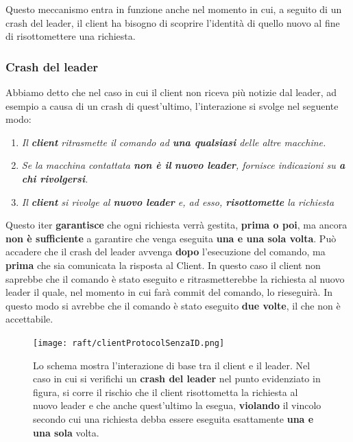	Questo meccanismo entra in funzione anche nel momento in cui, a seguito di un crash del leader, il client ha bisogno di scoprire l'identità di quello nuovo al fine di risottomettere una richiesta.  

	\subsubsection{Crash del leader}

	Abbiamo detto che nel caso in cui il client non riceva più notizie dal leader, ad esempio a causa di un crash di quest'ultimo, l'interazione si svolge nel seguente modo:

	\begin{enumerate}
		\item{\emph{Il \textbf{client} ritrasmette il comando ad \textbf{una qualsiasi} delle altre macchine. }}
		\item{\emph{Se la macchina contattata \textbf{non è il }\textbf{nuovo leader}, fornisce indicazioni su \textbf{a chi rivolgersi}.}}
		\item{\emph{Il \textbf{client} si rivolge al \textbf{nuovo leader} e, ad esso, \textbf{risottomette} la richiesta}}
	\end{enumerate}

	Questo iter \textbf{garantisce} che ogni richiesta verrà gestita, \textbf{prima o poi}, ma ancora \textbf{non è sufficiente} a garantire che venga eseguita \textbf{una e una sola volta}. 
	Può accadere che il crash del leader avvenga \textbf{dopo} l'esecuzione del comando, ma \textbf{prima} che sia comunicata la risposta al Client. 
	In questo caso il client non saprebbe che il comando è stato eseguito e ritrasmetterebbe la richiesta al nuovo leader il quale, nel momento in cui farà commit del comando, lo rieseguirà. In questo modo si avrebbe che il comando è stato eseguito \textbf{due volte}, il che non è accettabile.

	  \begin{figure}[H]
	    \centering
	    \texttt{[image: raft/clientProtocolSenzaID.png]}
	    \caption{Lo schema mostra l'interazione di base tra il client e il leader. Nel caso in cui si verifichi un \textbf{crash del leader} nel punto evidenziato in figura, si corre il rischio che il client risottometta la richiesta al nuovo leader e che anche quest'ultimo la esegua, \textbf{violando} il vincolo secondo cui una richiesta debba essere eseguita esattamente \textbf{una e una sola} volta.  }
	    \label{fig:figure 12}
	  \end{figure}
 
